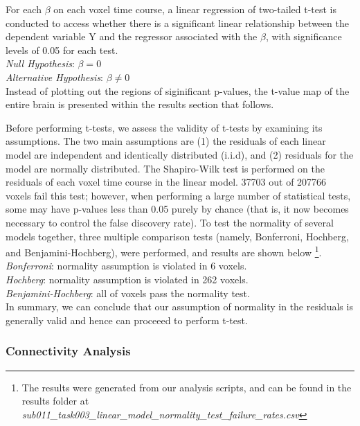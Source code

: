 \documentclass[11pt]{article}
\begin{document}
For each $\beta$ on each voxel time course, a linear regression of two-tailed
t-test is conducted to access whether there is a significant linear relationship
between the dependent variable Y and the regressor associated with the $\beta$,
with significance levels of 0.05 for each test. \\
 
\textit{Null Hypothesis}: $ \beta = 0$ \\

\textit{Alternative Hypothesis}: $\beta \neq 0$ \\

Instead of plotting out the regions of siginificant p-values, the t-value map of
the entire brain is presented within the results section that follows. 

Before performing t-tests, we assess the validity of t-tests by examining its
assumptions. The two main assumptions are (1) the residuals of each linear model
are independent and identically distributed (i.i.d), and (2) residuals for the model
are normally distributed. The Shapiro-Wilk test is performed on the residuals of
each voxel time course in the linear model. 37703 out of 207766 voxels fail this
test; however, when performing a large number of statistical tests, some may have
p-values less than 0.05 purely by chance (that is, it now becomes necessary to control the false discovery rate). To test the normality of several models together, three multiple comparison tests (namely, Bonferroni, Hochberg, and Benjamini-Hochberg), were performed, and results are shown below \footnote{The results were generated from our analysis scripts, and can be found in the results folder at \textit{sub011\_task003\_linear\_model\_normality\_test\_failure\_rates.csv}}. \\

\textit{Bonferroni}: normality assumption is violated in 6 voxels. \\

\textit{Hochberg}: normality assumption is violated in 262 voxels. \\

\textit{Benjamini-Hochberg}: all of voxels pass the normality test. \\

In summary, we can conclude that our assumption of normality in the residuals is
generally valid and hence can proceeed to perform t-test.

\subsubsection{Connectivity Analysis}
\end{document}
